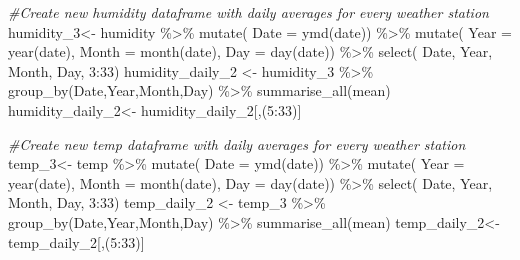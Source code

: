 \documentclass[
]{article}
\newenvironment{Shaded}{\begin{snugshade}}{\end{snugshade}}
\newcommand{\AttributeTok}[1]{\textcolor[rgb]{0.77,0.63,0.00}{#1}}
\newcommand{\CommentTok}[1]{\textcolor[rgb]{0.56,0.35,0.01}{\textit{#1}}}
\newcommand{\DecValTok}[1]{\textcolor[rgb]{0.00,0.00,0.81}{#1}}
\newcommand{\FunctionTok}[1]{\textcolor[rgb]{0.00,0.00,0.00}{#1}}
\newcommand{\NormalTok}[1]{#1}
\newcommand{\OtherTok}[1]{\textcolor[rgb]{0.56,0.35,0.01}{#1}}
\newcommand{\SpecialCharTok}[1]{\textcolor[rgb]{0.00,0.00,0.00}{#1}}
\begin{document}
\begin{Shaded}
\begin{Highlighting}[]
\CommentTok{\#Create new humidity dataframe with daily averages for every weather station}
\NormalTok{humidity\_3}\OtherTok{\textless{}{-}}\NormalTok{ humidity }\SpecialCharTok{\%\textgreater{}\%} 
  \FunctionTok{mutate}\NormalTok{( }\AttributeTok{Date =} \FunctionTok{ymd}\NormalTok{(date)) }\SpecialCharTok{\%\textgreater{}\%} 
  \FunctionTok{mutate}\NormalTok{( }\AttributeTok{Year =} \FunctionTok{year}\NormalTok{(date), }
          \AttributeTok{Month =} \FunctionTok{month}\NormalTok{(date), }
          \AttributeTok{Day =} \FunctionTok{day}\NormalTok{(date)) }\SpecialCharTok{\%\textgreater{}\%} 
  \FunctionTok{select}\NormalTok{( Date, Year, Month, Day, }\DecValTok{3}\SpecialCharTok{:}\DecValTok{33}\NormalTok{)}
\NormalTok{humidity\_daily\_2 }\OtherTok{\textless{}{-}}\NormalTok{ humidity\_3 }\SpecialCharTok{\%\textgreater{}\%} 
  \FunctionTok{group\_by}\NormalTok{(Date,Year,Month,Day) }\SpecialCharTok{\%\textgreater{}\%}
  \FunctionTok{summarise\_all}\NormalTok{(mean)}
\NormalTok{humidity\_daily\_2}\OtherTok{\textless{}{-}}\NormalTok{ humidity\_daily\_2[,(}\DecValTok{5}\SpecialCharTok{:}\DecValTok{33}\NormalTok{)]}

\CommentTok{\#Create new temp dataframe with daily averages for every weather station}
\NormalTok{temp\_3}\OtherTok{\textless{}{-}}\NormalTok{ temp }\SpecialCharTok{\%\textgreater{}\%} 
  \FunctionTok{mutate}\NormalTok{( }\AttributeTok{Date =} \FunctionTok{ymd}\NormalTok{(date)) }\SpecialCharTok{\%\textgreater{}\%} 
  \FunctionTok{mutate}\NormalTok{( }\AttributeTok{Year =} \FunctionTok{year}\NormalTok{(date), }
          \AttributeTok{Month =} \FunctionTok{month}\NormalTok{(date), }
          \AttributeTok{Day =} \FunctionTok{day}\NormalTok{(date)) }\SpecialCharTok{\%\textgreater{}\%} 
  \FunctionTok{select}\NormalTok{( Date, Year, Month, Day, }\DecValTok{3}\SpecialCharTok{:}\DecValTok{33}\NormalTok{)}
\NormalTok{temp\_daily\_2 }\OtherTok{\textless{}{-}}\NormalTok{ temp\_3 }\SpecialCharTok{\%\textgreater{}\%} 
  \FunctionTok{group\_by}\NormalTok{(Date,Year,Month,Day) }\SpecialCharTok{\%\textgreater{}\%}
  \FunctionTok{summarise\_all}\NormalTok{(mean)}
\NormalTok{temp\_daily\_2}\OtherTok{\textless{}{-}}\NormalTok{ temp\_daily\_2[,(}\DecValTok{5}\SpecialCharTok{:}\DecValTok{33}\NormalTok{)]}


\end{Highlighting}
\end{Shaded}
\end{document}
